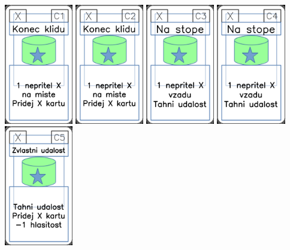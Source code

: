 \documentclass[a4paper]{article}
\begin{document}
	\includegraphics[width=3.0cm]{img-5_10}
	\includegraphics[width=3.0cm]{img-5_11}
	\includegraphics[width=3.0cm]{img-5_12}
	\includegraphics[width=3.0cm]{img-5_13}
	\includegraphics[width=3.0cm]{img-5_14}
\end{document}
